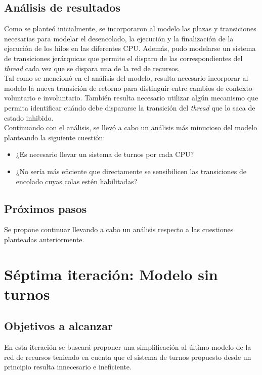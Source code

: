 \documentclass[a4paper]{book}
\begin{document}
\subsection{An\'alisis de resultados}
Como se plante\'o inicialmente, se incorporaron al modelo las plazas y transiciones necesarias para modelar el desencolado, la ejecuci\'on y la finalizaci\'on de la ejecuci\'on de los hilos en las diferentes CPU. Adem\'as, pudo modelarse un sistema de transiciones jer\'arquicas que permite el disparo de las correspondientes del \emph{thread} cada vez que se dispara una de la red de recursos.\\

Tal como se mencion\'o en el an\'alisis del modelo, resulta necesario incorporar al modelo la nueva transici\'on de retorno para distinguir entre cambios de contexto voluntario e involuntario. Tambi\'en resulta necesario utilizar alg\'un mecanismo que permita identificar cu\'ando debe dispararse la transici\'on del \emph{thread} que lo saca de estado inhibido.\\

Continuando con el an\'alisis, se llev\'o a cabo un an\'alisis m\'as minucioso del modelo planteando la siguiente cuesti\'on:
\begin{itemize}
\item ¿Es necesario llevar un sistema de turnos por cada CPU?
\item ¿No ser\'ia más eficiente que directamente se sensibilicen las transiciones de encolado cuyas colas est\'en habilitadas?
\end{itemize}

\subsection{Pr\'oximos pasos}
Se propone continuar llevando a cabo un an\'alisis respecto a las cuestiones planteadas anteriormente.


\newpage
\section{Séptima iteraci\'on: Modelo sin turnos}

\subsection{Objetivos a alcanzar}
En esta iteraci\'on se buscar\'a proponer una simplificaci\'on al \'ultimo modelo de la red de recursos teniendo en cuenta que el sistema de turnos propuesto desde un principio resulta innecesario e ineficiente.
\end{document}
